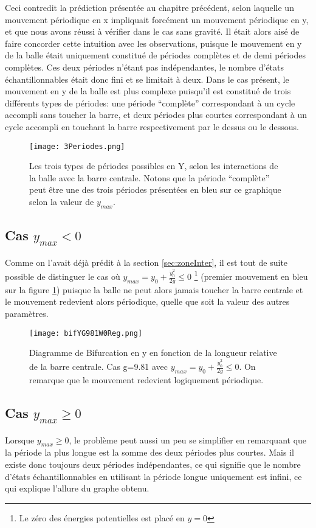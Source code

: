 \documentclass[a4paper]{report}
\begin{document}
Ceci contredit la prédiction présentée au chapitre précédent, selon laquelle un mouvement périodique en x impliquait forcément un mouvement périodique en y, et que nous avons réussi à vérifier dans le cas sans gravité. Il était alors aisé de faire concorder cette intuition avec les observations, puisque le mouvement en y de la balle était uniquement constitué de périodes complètes et de demi périodes complètes. Ces deux périodes n'étant pas indépendantes, le nombre d'états échantillonnables était donc fini et se limitait à deux. Dans le cas présent, le mouvement en y de la balle est plus complexe puisqu'il est constitué de trois différents types de périodes: une période ``complète'' correspondant à un cycle accompli sans toucher la barre, et deux périodes plus courtes correspondant à un cycle accompli en touchant la barre respectivement par le dessus ou le dessous.
\begin{figure}[h!]
   \texttt{[image: 3Periodes.png]}
      \caption[Les trois types de périodes possible en Y]{Les trois types de périodes possibles en Y, selon les interactions de la balle avec la barre centrale. Notons que la période ``complète'' peut être une des trois périodes présentées en bleu sur ce graphique selon la valeur de \(y_{max}\).}
   \label{fig:typesPeriodes}
\end{figure}

\subsection{Cas $ y_{max}<0 $}
Comme on l'avait déjà prédit à la section \ref{sec:zoneInter}, il est tout de suite possible de distinguer le cas où \(y_{max}=y_0+\frac{\dot{y}_0^2}{2g} \leq 0\) \footnote{Le zéro des énergies potentielles est placé en \(y=0\)} (premier mouvement en bleu sur la figure \ref{fig:typesPeriodes}) puisque la balle ne peut alors jamais toucher la barre centrale et le mouvement redevient alors périodique, quelle que soit la valeur des autres paramètres.
\begin{figure}[H]
   \texttt{[image: bifYG981W0Reg.png]}
      \caption[Diagramme de Bifurcation en y: g=9.81 \( \omega=0 \; \, y_{max} \leq 0\)]{Diagramme de Bifurcation en y en fonction de la longueur relative de la barre centrale. Cas g=9.81 avec \(y_{max}=y_0+\frac{\dot{y}_0^2}{2g} \leq 0\). On remarque que le mouvement redevient logiquement périodique.}
\end{figure}

\subsection{Cas $ y_{max} \geq 0 $}
Lorsque \(y_{max}\geq 0\), le problème peut aussi un peu se simplifier en remarquant que la période la plus longue est la somme des deux périodes plus courtes\label{propr:sommePeriodes}. Mais il existe donc toujours deux périodes indépendantes, ce qui signifie que le nombre d'états échantillonnables en utilisant la période longue uniquement est infini, ce qui explique l'allure du graphe obtenu.
\end{document}
